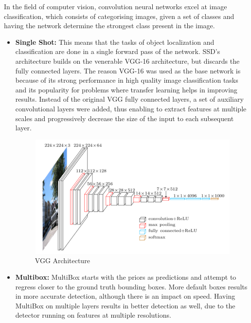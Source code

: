 \documentclass[conference]{IEEEtran}
\begin{document}
	In the field of computer vision, convolution neural networks excel at image classification, which consists of categorising images, given a set of classes and having the network determine the strongest class present in the image. 
	
	\begin{itemize}
		
		\item \textbf{Single Shot: } This means that the tasks of object localization and classification are done in a single forward pass of the network. SSD’s architecture builds on the venerable VGG-16\cite{b6} architecture, but discards the fully connected layers. The reason VGG-16 was used as the base network is because of its strong performance in high quality image classification tasks and its popularity for problems where transfer learning helps in improving results. Instead of the original VGG fully connected layers, a set of auxiliary convolutional layers were added, thus enabling to extract features at multiple scales and progressively decrease the size of the input to each subsequent layer.
		
		\begin{figure}[htbp]
			\centerline{\includegraphics[scale=0.5]{ssd.png}}
			\caption{VGG Architecture}
			\label{fig}
		\end{figure}
		
		
		\item \textbf{Multibox: } MultiBox starts with the priors as predictions and attempt to regress closer to the ground truth bounding boxes. More default boxes results in more accurate detection, although there is an impact on speed. Having MultiBox on multiple layers results in better detection as well, due to the detector running on features at multiple resolutions. 
		
		
	\end{itemize}
	
\end{document}
